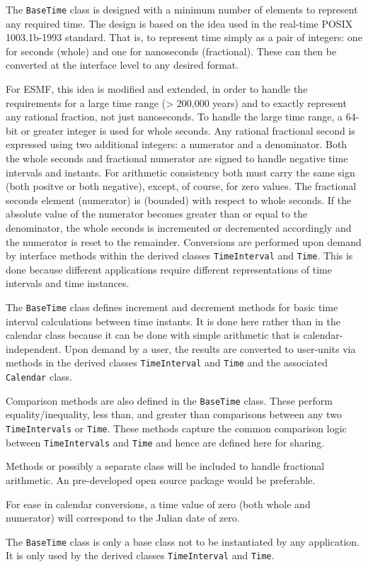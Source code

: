 
The {\tt BaseTime} class is designed with a minimum number of elements
to represent any required time.  The design is based on the idea used
in the real-time POSIX 1003.1b-1993 standard.  That is, to represent
time simply as a pair of integers: one for seconds (whole) and one for
nanoseconds (fractional).  These can then be converted at the interface
level to any desired format.

For ESMF, this idea is modified and extended, in order to handle the
requirements for a large time range (> 200,000 years) and to exactly
represent any rational fraction, not just nanoseconds.  To handle the
large time range, a 64-bit or greater integer is used for whole seconds.
Any rational fractional second is expressed using two additional integers:
a numerator and a denominator.  Both the whole seconds and fractional
numerator are signed to handle negative time intervals and instants.
For arithmetic consistency both must carry the same sign (both positve
or both negative), except, of course, for zero values.  The fractional
seconds element (numerator) is 
(bounded) with respect to whole seconds. If the absolute value of the
numerator becomes greater than or equal to the denominator, the whole
seconds is incremented or decremented accordingly and the numerator is
reset to the remainder.  Conversions are performed upon demand by
interface methods within the derived classes {\tt TimeInterval} and
{\tt Time}.  This is done because different applications require different
representations of time intervals and time instances.

The {\tt BaseTime} class defines increment and decrement methods for basic
time interval calculations between time instants.  It is done here rather
than in the calendar class because it can be done with simple arithmetic
that is calendar-independent.  Upon demand by a user, the results are
converted to user-units via methods in the derived classes {\tt TimeInterval}
and {\tt Time} and the associated {\tt Calendar} class.

Comparison methods are also defined in the {\tt BaseTime} class.  These
perform equality/inequality, less than, and greater than comparisons
between any two {\tt TimeIntervals} or {\tt Time}.  These methods capture
the common comparison logic between {\tt TimeIntervals} and {\tt Time} and
hence are defined here for sharing.

Methods or possibly a separate class will be included to handle fractional
arithmetic.  An pre-developed open source package would be preferable.

For ease in calendar conversions, a time value of zero (both whole and
numerator) will correspond to the Julian date of zero.

The {\tt BaseTime} class is only a base class not to be instantiated by any
application. It is only used by the derived classes {\tt TimeInterval} and
{\tt Time}.

